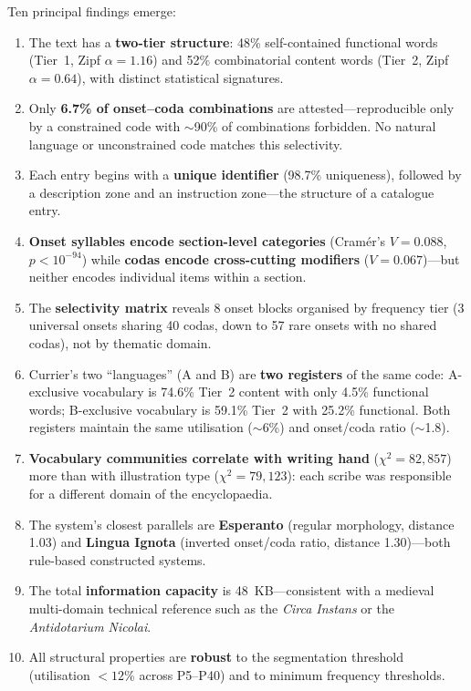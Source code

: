 Ten principal findings emerge:

\begin{enumerate}[nosep]
  \item The text has a \textbf{two-tier structure}: 48\% self-contained functional words (Tier~1, Zipf $\alpha = 1.16$) and 52\% combinatorial content words (Tier~2, Zipf $\alpha = 0.64$), with distinct statistical signatures.
  \item Only \textbf{6.7\% of onset--coda combinations} are attested---reproducible only by a constrained code with $\sim$90\% of combinations forbidden.  No natural language or unconstrained code matches this selectivity.
  \item Each entry begins with a \textbf{unique identifier} (98.7\% uniqueness), followed by a description zone and an instruction zone---the structure of a catalogue entry.
  \item \textbf{Onset syllables encode section-level categories} (Cram\'er's $V = 0.088$, $p < 10^{-94}$) while \textbf{codas encode cross-cutting modifiers} ($V = 0.067$)---but neither encodes individual items within a section.
  \item The \textbf{selectivity matrix} reveals 8 onset blocks organised by frequency tier (3 universal onsets sharing 40 codas, down to 57 rare onsets with no shared codas), not by thematic domain.
  \item Currier's two ``languages'' (A and B) are \textbf{two registers} of the same code: A-exclusive vocabulary is 74.6\% Tier~2 content with only 4.5\% functional words; B-exclusive vocabulary is 59.1\% Tier~2 with 25.2\% functional.  Both registers maintain the same utilisation ($\sim$6\%) and onset/coda ratio ($\sim$1.8).
  \item \textbf{Vocabulary communities correlate with writing hand} ($\chi^2 = 82{,}857$) more than with illustration type ($\chi^2 = 79{,}123$): each scribe was responsible for a different domain of the encyclopaedia.
  \item The system's closest parallels are \textbf{Esperanto} (regular morphology, distance 1.03) and \textbf{Lingua Ignota} (inverted onset/coda ratio, distance 1.30)---both rule-based constructed systems.
  \item The total \textbf{information capacity} is 48~KB---consistent with a medieval multi-domain technical reference such as the \textit{Circa Instans} or the \textit{Antidotarium Nicolai}.
  \item All structural properties are \textbf{robust} to the segmentation threshold (utilisation $< 12$\% across P5--P40) and to minimum frequency thresholds.
\end{enumerate}

